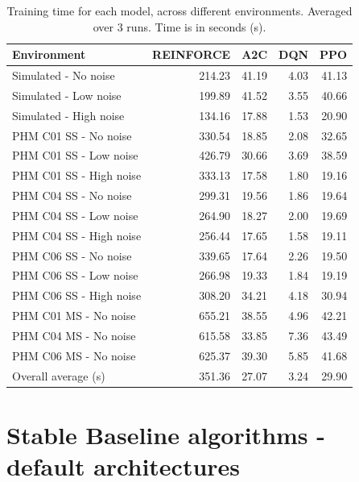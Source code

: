 \documentclass[a4paper, 12pt]{article}
\newcommand{\rowspace}[1]{\renewcommand{\arraystretch}{#1}}
\begin{document}
\begin{table}[hbt!]\centering
	\sffamily
	\rowspace{1.3}
	\begin{tabular}{@{}l r r r r@{}}
		\arrayrulecolor{black!40}\toprule
		\textbf{Environment} &\textbf{REINFORCE} &\textbf{A2C}&\textbf{DQN}&\textbf{PPO}\\ \midrule
		Simulated  - No noise &214.23 &41.19&4.03&41.13\\
		Simulated  - Low noise &199.89 &41.52&3.55&40.66\\
		Simulated  - High noise &134.16 &17.88&1.53&20.90\\ \midrule
		
		PHM C01 SS - No noise &330.54 &18.85&2.08&32.65\\
		PHM C01 SS - Low noise &426.79 &30.66&3.69&38.59\\
		PHM C01 SS - High noise &333.13 &17.58&1.80&19.16\\ \midrule
		
		PHM C04 SS - No noise &299.31 &19.56&1.86&19.64\\
		PHM C04 SS - Low noise &264.90 &18.27&2.00&19.69\\
		PHM C04 SS - High noise &256.44 &17.65&1.58&19.11\\ \hdashline
		
		PHM C06 SS - No noise &339.65 &17.64&2.26&19.50\\
		PHM C06 SS - Low noise &266.98 &19.33&1.84&19.19\\
		PHM C06 SS - High noise &308.20 &34.21&4.18&30.94\\ \hdashline
		
		PHM C01 MS - No noise &655.21 &38.55&4.96&42.21\\
		PHM C04 MS - No noise &615.58 &33.85&7.36&43.49\\
		PHM C06 MS - No noise &625.37 &39.30&5.85&41.68\\  \midrule
		
		Overall average (s) &351.36 &27.07&3.24&29.90\\
		\bottomrule
\end{tabular}
\caption{Training time for each model, across different environments. Averaged over 3 runs. Time is in seconds (s).}
\label{tbl:TrainingTimes}
\end{table}



\section{Stable Baseline algorithms - default architectures}
\end{document}
